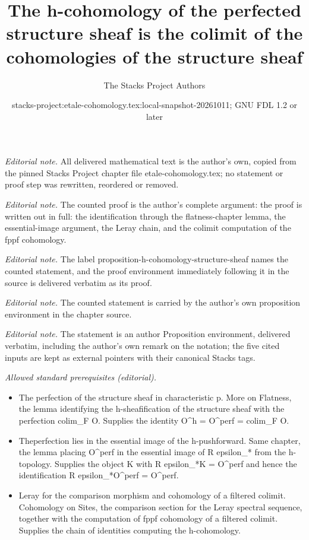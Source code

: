 \documentclass[10pt,a4paper]{amsart}
\title{The h-cohomology of the perfected structure sheaf is the colimit of the cohomologies of the structure sheaf}
\author{The Stacks Project Authors}
\date{stacks-project:etale-cohomology.tex:local-snapshot-20261011; GNU FDL 1.2 or later}
\theoremstyle{plain}
\theoremstyle{definition}
\theoremstyle{remark}
\numberwithin{equation}{subsection}
\begin{document}
\maketitle
\noindent\textit{Editorial note.} All delivered mathematical text is the author's own, copied from the pinned Stacks Project chapter file etale-cohomology.tex; no statement or proof step was rewritten, reordered or removed.\par\medskip
\noindent\textit{Editorial note.} The counted proof is the author's complete argument: the proof is written out in full: the identification through the flatness-chapter lemma, the essential-image argument, the Leray chain, and the colimit computation of the fppf cohomology.\par\medskip
\noindent\textit{Editorial note.} The label proposition-h-cohomology-structure-sheaf names the counted statement, and the proof environment immediately following it in the source is delivered verbatim as its proof.\par\medskip
\noindent\textit{Editorial note.} The counted statement is carried by the author's own proposition environment in the chapter source.\par\medskip
\noindent\textit{Editorial note.} The statement is an author Proposition environment, delivered verbatim, including the author's own remark on the notation; the five cited inputs are kept as external pointers with their canonical Stacks tags.\par\medskip
\noindent\textit{Allowed standard prerequisites (editorial).}\begin{itemize}
\item The perfection of the structure sheaf in characteristic p. More on Flatness, the lemma identifying the h-sheafification of the structure sheaf with the perfection colim\_F O. Supplies the identity O\textasciicircum{}h = O\textasciicircum{}perf = colim\_F O.
\item Theperfection lies in the essential image of the h-pushforward. Same chapter, the lemma placing O\textasciicircum{}perf in the essential image of R epsilon\_* from the h-topology. Supplies the object K with R epsilon\_*K = O\textasciicircum{}perf and hence the identification R epsilon\_*O\textasciicircum{}perf = O\textasciicircum{}perf.
\item Leray for the comparison morphism and cohomology of a filtered colimit. Cohomology on Sites, the comparison section for the Leray spectral sequence, together with the computation of fppf cohomology of a filtered colimit. Supplies the chain of identities computing the h-cohomology.
\end{itemize}\medskip
\end{document}
